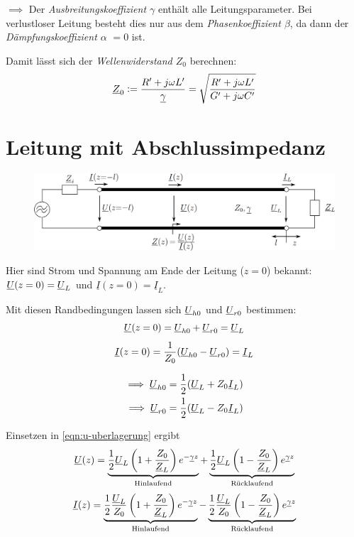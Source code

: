 $\implies$ Der \emph{Ausbreitungskoeffizient $\gamma$} enthält alle Leitungsparameter.
Bei verlustloser Leitung besteht dies nur aus dem \emph{Phasenkoeffizient $\beta$}, da dann der \emph{Dämpfungskoeffizient $\alpha$} $= 0$ ist.

Damit lässt sich der \emph{Wellenwiderstand $Z_0$} berechnen:
\begin{equation}
    \underline{Z}_0 := \frac{R'+j\omega L'}{\underline{\gamma}} = \sqrt{\frac{R'+j\omega L'}{G'+j\omega C'}}
\end{equation}



\section{Leitung mit Abschlussimpedanz}
\begin{figure}[H]
    \centering
    \includegraphics[width=\textwidth]{images/leitung_abschlussimpedanz.png}
\end{figure}
Hier sind Strom und Spannung am Ende der Leitung ($z=0$) bekannt: $\underline{U}(z=0)=\underline{U}_L$ und $\underline{I}(z=0)=\underline{I}_L$.

Mit diesen Randbedingungen lassen sich $\underline{U}_{h0}$ und $\underline{U}_{r0}$ bestimmen:
\begin{equation*}
    \underline{U}(z=0) = \underline{U}_{h0} + \underline{U}_{r0} = \underline{U}_L
\end{equation*}
\begin{equation*}
    \underline{I}(z=0) = \frac{1}{Z_0} (\underline{U}_{h0} - \underline{U}_{r0}) = \underline{I}_L
\end{equation*}

\begin{align}
    \implies \underline{U}_{h0} &= \frac{1}{2} (\underline{U}_L + Z_0 \underline{I}_L)\\
    \implies \underline{U}_{r0} &= \frac{1}{2} (\underline{U}_L - Z_0 \underline{I}_L)
\end{align}

Einsetzen in \eqref{eqn:u-uberlagerung} ergibt
\begin{equation}
    \underline{U}(z) = \underbrace{ \frac{1}{2} \underline{U}_L \left( 1 + \frac{Z_0}{\underline{Z}_L} \right) e^{-\underline{\gamma} z} }_{\text{Hinlaufend}} + \underbrace{ \frac{1}{2} \underline{U}_L \left( 1 - \frac{Z_0}{\underline{Z}_L} \right) e^{\underline{\gamma} z} }_{\text{Rücklaufend}}
    \label{eqn:u-uberlagerung-z}
\end{equation}
\begin{equation}
    \underline{I}(z) = \underbrace{ \frac{1}{2} \frac{\underline{U}_L}{Z_0} \left( 1 + \frac{Z_0}{\underline{Z}_L} \right) e^{-\underline{\gamma} z} }_{\text{Hinlaufend}} - \underbrace{ \frac{1}{2} \frac{\underline{U}_L}{Z_0} \left( 1 - \frac{Z_0}{\underline{Z}_L} \right) e^{\underline{\gamma} z} }_{\text{Rücklaufend}}
    \label{eqn:i-uberlagerung-z}
\end{equation}

